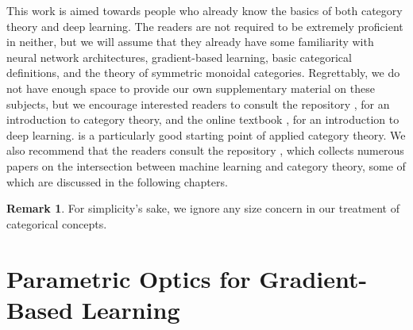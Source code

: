 \documentclass[11pt,a4paper,openright,twoside]{report}
\newcounter{mycounter}
\theoremstyle{plain}
\theoremstyle{definition}
\newtheorem{remark}[mycounter]{Remark}
\begin{document}
This work is aimed towards people who already know the basics of both category theory and deep learning. The readers are not required to be extremely proficient in neither, but we will assume that they already have some familiarity with neural network architectures, gradient-based learning, basic categorical definitions, and the theory of symmetric monoidal categories. Regrettably, we do not have enough space to provide our own supplementary material on these subjects, but we encourage interested readers to consult the repository \cite{gavranovic2023category}, for an introduction to category theory, and the online textbook \cite{zhang2021dive}, for an introduction to deep learning. \cite{fong2018seven} is a particularly good starting point of applied category theory. We also recommend that the readers consult the repository \cite{gavranovic2023intersection}, which collects numerous papers on the intersection between machine learning and category theory, some of which are discussed in the following chapters.

\begin{remark}
  For simplicity's sake, we ignore any size concern in our treatment of categorical concepts.
\end{remark}

\clearpage{\pagestyle{empty}\cleardoublepage}



\tableofcontents
\rhead[\fancyplain{}{\bfseries\leftmark}]{\fancyplain{}{\bfseries\thepage}} 
\clearpage{\pagestyle{empty}\cleardoublepage}



\listoffigures  
\rhead[\fancyplain{}{\bfseries\leftmark}]{\fancyplain{}{\bfseries\thepage}} 
\clearpage{\pagestyle{empty}\cleardoublepage}



\chapter{Parametric Optics for Gradient-Based Learning}
\lhead[\fancyplain{}{\bfseries\thepage}]{\fancyplain{}{\bfseries\rightmark}}
\end{document}
